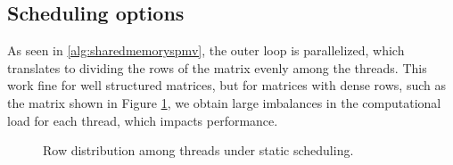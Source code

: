 \subsection{Scheduling options}
\label{sec:schedulingoptions}
As seen in \autoref{alg:sharedmemoryspmv}, the outer loop is parallelized, which translates to dividing the rows of the matrix evenly among the threads. This work fine for well structured matrices, but for matrices with dense rows, such as the matrix shown in Figure \ref{fig:staticscheduling}, we obtain large imbalances in the computational load for each thread, which impacts performance. 

\begin{figure}[H]
    \centering
    \caption{Row distribution among threads under static scheduling.}
    \label{fig:staticscheduling}
\end{figure}





